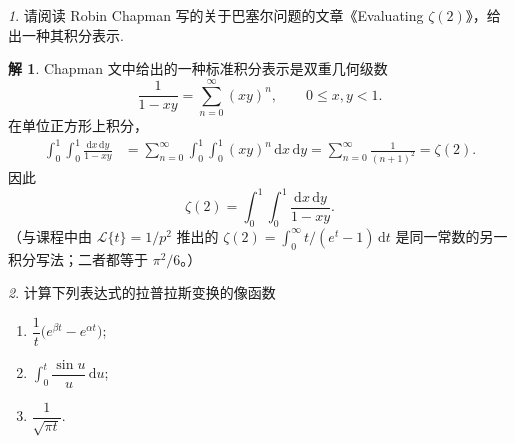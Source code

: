 \documentclass[11pt]{article}
\theoremstyle{remark}
\newtheorem{problem}{}
\theoremstyle{definition}
\newtheorem{solution}{解}
\begin{document}
\begin{problem}
请阅读 Robin Chapman 写的关于巴塞尔问题的文章《Evaluating $\zeta(2)$》，给出一种其积分表示.
\end{problem}

\begin{solution}
Chapman 文中给出的一种标准积分表示是双重几何级数
\[
\frac{1}{1-xy}
=\sum_{n=0}^{\infty}(xy)^n,
\qquad 0\leq x,y<1.
\]
在单位正方形上积分，
\begin{align*}
\int_0^1\int_0^1\frac{\mathrm{d}x\,\mathrm{d}y}{1-xy}
&=\sum_{n=0}^{\infty}
  \int_0^1\int_0^1 (xy)^n\,\mathrm{d}x\,\mathrm{d}y
=\sum_{n=0}^{\infty}\frac{1}{(n+1)^2}
=\zeta(2).
\end{align*}
因此
\[
\zeta(2)=\int_0^1\int_0^1\frac{\mathrm{d}x\,\mathrm{d}y}{1-xy}.
\]
（与课程中由 $\mathcal{L}\{t\}=1/p^2$ 推出的
$\zeta(2)=\displaystyle\int_0^{\infty}t/(e^t-1)\,\mathrm{d}t$
是同一常数的另一积分写法；二者都等于 $\pi^2/6$。）
\end{solution}

\begin{problem}
  计算下列表达式的拉普拉斯变换的像函数
  \begin{enumerate}
    \item $\dfrac{1}{t}\bigl(e^{\beta t}-e^{\alpha t}\bigr)$;
    \item $\displaystyle\int_0^t\dfrac{\sin u}{u}\,\mathrm{d}u$;
    \item $\dfrac{1}{\sqrt{\pi t}}$.
  \end{enumerate}
\end{problem}
\end{document}
